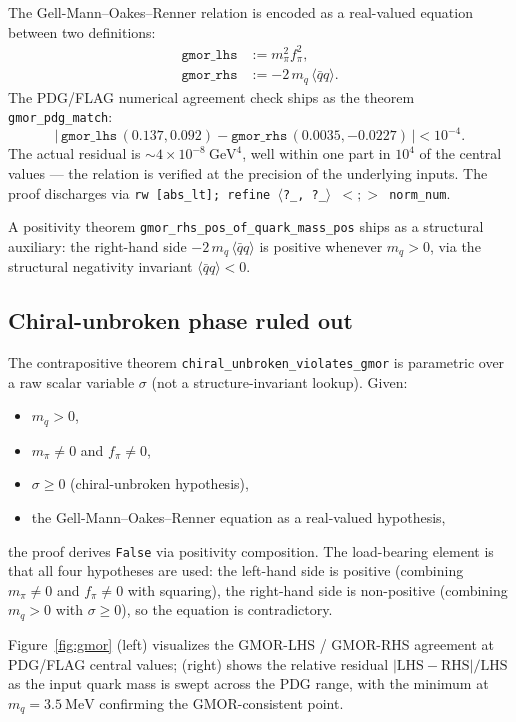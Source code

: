 \documentclass[twocolumn]{revtex4-2}
\newcommand{\qbarq}{\langle \bar{q} q \rangle}
\newcommand{\fpi}{f_{\pi}}
\newcommand{\mpi}{m_{\pi}}
\newcommand{\mq}{m_q}
\begin{document}
The Gell-Mann--Oakes--Renner relation is encoded as a real-valued
equation between two definitions:
\begin{align}
\texttt{gmor\_lhs} &:= \mpi^2 \fpi^2, \\
\texttt{gmor\_rhs} &:= -2\,\mq\,\qbarq.
\end{align}
The PDG/FLAG numerical agreement check ships as the theorem
\texttt{gmor\_pdg\_match}:
\begin{equation}
\bigl|\,\texttt{gmor\_lhs}\,(0.137, 0.092) -
\texttt{gmor\_rhs}\,(0.0035, -0.0227)\,\bigr| < 10^{-4}.
\label{eq:gmor-pdg-match}
\end{equation}
The actual residual is $\sim 4 \times 10^{-8}~\mathrm{GeV}^4$, well
within one part in $10^4$ of the central values --- the relation is
verified at the precision of the underlying inputs. The proof
discharges via \texttt{rw [abs\_lt]; refine $\langle$?\_, ?\_$\rangle$
$<;>$ norm\_num}.

A positivity theorem
\texttt{gmor\_rhs\_pos\_of\_quark\_mass\_pos} ships as a structural
auxiliary: the right-hand side $-2\,\mq\,\qbarq$ is positive whenever
$\mq > 0$, via the structural negativity invariant $\qbarq < 0$.

\subsection{Chiral-unbroken phase ruled out}

The contrapositive theorem
\texttt{chiral\_unbroken\_violates\_gmor} is parametric over a raw
scalar variable $\sigma$ (not a structure-invariant lookup). Given:
\begin{itemize}
\item $\mq > 0$,
\item $\mpi \ne 0$ and $\fpi \ne 0$,
\item $\sigma \ge 0$ (chiral-unbroken hypothesis),
\item the Gell-Mann--Oakes--Renner equation as a real-valued
hypothesis,
\end{itemize}
the proof derives \texttt{False} via positivity composition. The
load-bearing element is that all four hypotheses are used: the
left-hand side is positive (combining $\mpi \ne 0$ and $\fpi \ne 0$
with squaring), the right-hand side is non-positive (combining $\mq
> 0$ with $\sigma \ge 0$), so the equation is contradictory.

Figure~\ref{fig:gmor} (left) visualizes the GMOR-LHS / GMOR-RHS
agreement at PDG/FLAG central values; (right) shows the relative
residual $|\mathrm{LHS} - \mathrm{RHS}|/\mathrm{LHS}$ as the input
quark mass is swept across the PDG range, with the minimum at
$\mq = 3.5~\mathrm{MeV}$ confirming the GMOR-consistent point.
\end{document}
